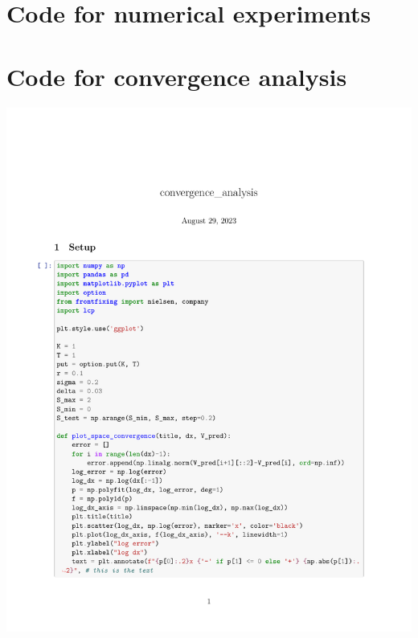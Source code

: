 \documentclass{uonmathreport}
\begin{document}
\appendix


\section{Code for numerical experiments} \label{sec:numericalexperiments}

\section{Code for convergence analysis} \label{sec:convergenceanalysis}
\vspace{2cm}
\includegraphics[scale=0.9, clip, trim={2.5cm, 2.5cm 0mm 7cm}]{chapters/appendix/convergence_analysis}

\newpage
\printbibliography
\end{document}
